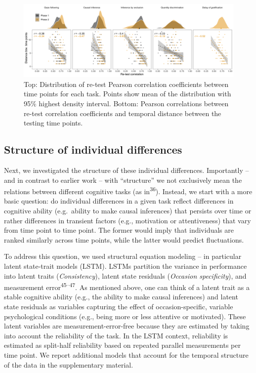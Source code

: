 \documentclass[
  man,floatsintext]{apa6}
\begin{document}
\begin{figure}
\includegraphics[width=1\linewidth]{./figures/reliability} \caption{Top: Distribution of re-test Pearson correlation coefficients between time points for each task. Points show mean of the distribution with 95\% highest density interval. Bottom: Pearson correlations between re-test correlation coefficients and temporal distance between the testing time points.}\label{fig:relplot}
\end{figure}

\hypertarget{structure-of-individual-differences}{%
\subsection{Structure of individual differences}\label{structure-of-individual-differences}}

Next, we investigated the structure of these individual differences. Importantly -- and in contrast to earlier work -- with ``structure'' we not exclusively mean the relations between different cognitive tasks (as in\textsuperscript{36}). Instead, we start with a more basic question: do individual differences in a given task reflect differences in cognitive ability (e.g.~ability to make causal inferences) that persists over time or rather differences in transient factors (e.g., motivation or attentiveness) that vary from time point to time point. The former would imply that individuals are ranked similarly across time points, while the latter would predict fluctuations.

To address this question, we used structural equation modeling -- in particular latent state-trait models (LSTM). LSTMs partition the variance in performance into latent traits (\emph{Consistency}), latent state residuals (\emph{Occasion specificity}), and measurement error\textsuperscript{45--47}. As mentioned above, one can think of a latent trait as a stable cognitive ability (e.g., the ability to make causal inferences) and latent state residuals as variables capturing the effect of occasion-specific, variable psychological conditions (e.g., being more or less attentive or motivated). These latent variables are measurement-error-free because they are estimated by taking into account the reliability of the task. In the LSTM context, reliability is estimated as split-half reliability based on repeated parallel measurements per time point. We report additional models that account for the temporal structure of the data in the supplementary material.
\end{document}

